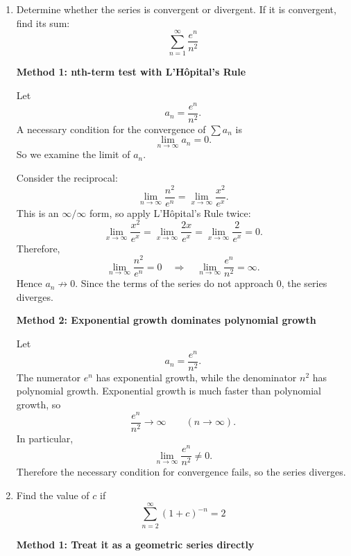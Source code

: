\documentclass[a4paper,12pt,twocolumn]{article}
\newenvironment{solutionbox}{\begin{framed}}{\end{framed}}
\begin{document}
\begin{enumerate}[label=\textbf{\arabic*.}, leftmargin=2em, itemsep=1.2em]
\begin{solutionbox}
\medskip
\textbf{Answer:}
\[
\boxed{\sum_{n=1}^{\infty}\left(\frac{1}{e^n}+\frac{1}{n(n+1)}\right)\text{ converges, and its sum is }\frac{e}{e-1}.}
\]
\end{solutionbox}

\item Determine whether the series is convergent or divergent. If it is convergent, find its sum:
\[
\sum_{n=1}^{\infty}\frac{e^n}{n^2}
\]

\begin{solutionbox}
\textbf{Method 1: nth-term test with L'Hôpital's Rule}

Let
\[
a_n=\frac{e^n}{n^2}.
\]
A necessary condition for the convergence of \(\sum a_n\) is
\[
\lim_{n\to\infty} a_n = 0.
\]
So we examine the limit of \(a_n\).

Consider the reciprocal:
\[
\lim_{n\to\infty}\frac{n^2}{e^n}
=
\lim_{x\to\infty}\frac{x^2}{e^x}.
\]
This is an \(\infty/\infty\) form, so apply L'Hôpital's Rule twice:
\[
\lim_{x\to\infty}\frac{x^2}{e^x}
=
\lim_{x\to\infty}\frac{2x}{e^x}
=
\lim_{x\to\infty}\frac{2}{e^x}
=0.
\]
Therefore,
\[
\lim_{n\to\infty}\frac{n^2}{e^n}=0
\quad\Longrightarrow\quad
\lim_{n\to\infty}\frac{e^n}{n^2}=\infty.
\]
Hence \(a_n \not\to 0\). Since the terms of the series do not approach \(0\), the series diverges.
\end{solutionbox}

\begin{solutionbox}
\textbf{Method 2: Exponential growth dominates polynomial growth}

Let
\[
a_n=\frac{e^n}{n^2}.
\]
The numerator \(e^n\) has exponential growth, while the denominator \(n^2\) has polynomial growth. Exponential growth is much faster than polynomial growth, so
\[
\frac{e^n}{n^2}\to\infty
\qquad (n\to\infty).
\]
In particular,
\[
\lim_{n\to\infty}\frac{e^n}{n^2}\neq 0.
\]
Therefore the necessary condition for convergence fails, so the series diverges.

\end{solutionbox}

\setcounter{enumi}{76}
\item Find the value of \(c\) if
\[
\sum_{n=2}^{\infty}(1+c)^{-n}=2
\]

\begin{solutionbox}
\textbf{Method 1: Treat it as a geometric series directly}


\end{solutionbox}
\end{enumerate}
\end{document}
